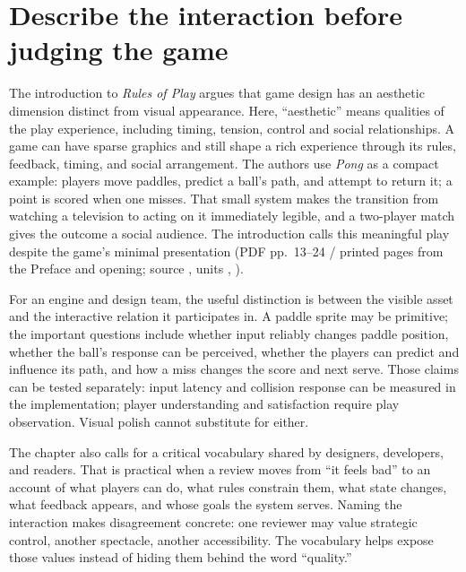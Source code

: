 \section{Describe the interaction before judging the game}\label{06-engine-ii-ch047-describe-the-interaction-before-judging-the-game}

\hypertarget{06-engine-ii-ch047-describe-the-interaction-before-judging-the-game}{}

The introduction to \emph{Rules of Play} argues that game design has an aesthetic dimension distinct from visual appearance. Here, ``aesthetic'' means qualities of the play experience, including timing, tension, control and social relationships. A game can have sparse graphics and still shape a rich experience through its rules, feedback, timing, and social arrangement. The authors use \emph{Pong} as a compact example: players move paddles, predict a ball's path, and attempt to return it; a point is scored when one misses. That small system makes the transition from watching a television to acting on it immediately legible, and a two-player match gives the outcome a social audience. The introduction calls this meaningful play despite the game's minimal presentation (PDF pp.~13--24 / printed pages from the Preface and opening; source , units , ).

For an engine and design team, the useful distinction is between the visible asset and the interactive relation it participates in. A paddle sprite may be primitive; the important questions include whether input reliably changes paddle position, whether the ball's response can be perceived, whether the players can predict and influence its path, and how a miss changes the score and next serve. Those claims can be tested separately: input latency and collision response can be measured in the implementation; player understanding and satisfaction require play observation. Visual polish cannot substitute for either.

The chapter also calls for a critical vocabulary shared by designers, developers, and readers. That is practical when a review moves from ``it feels bad'' to an account of what players can do, what rules constrain them, what state changes, what feedback appears, and whose goals the system serves. Naming the interaction makes disagreement concrete: one reviewer may value strategic control, another spectacle, another accessibility. The vocabulary helps expose those values instead of hiding them behind the word ``quality.''


